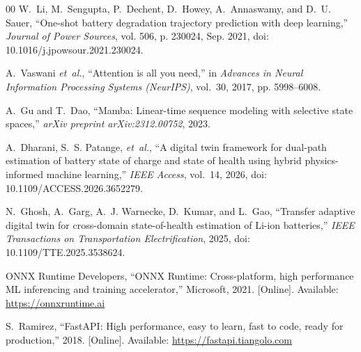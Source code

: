 \documentclass[conference]{IEEEtran}
\begin{document}
\begin{thebibliography}{00}
W.~Li, M.~Sengupta, P.~Dechent, D.~Howey, A.~Annaswamy, and D.~U. Sauer, ``One-shot battery degradation trajectory prediction with deep learning,'' \emph{Journal of Power Sources}, vol. 506, p. 230024, Sep. 2021, doi: 10.1016/j.jpowsour.2021.230024.

A.~Vaswani \emph{et~al.}, ``Attention is all you need,'' in \emph{Advances in Neural Information Processing Systems (NeurIPS)}, vol.~30, 2017, pp. 5998--6008.

A.~Gu and T.~Dao, ``Mamba: Linear-time sequence modeling with selective state spaces,'' \emph{arXiv preprint arXiv:2312.00752}, 2023.

A.~Dharani, S.~S. Patange, \emph{et~al.}, ``A digital twin framework for dual-path estimation of battery state of charge and state of health using hybrid physics-informed machine learning,'' \emph{IEEE Access}, vol.~14, 2026, doi: 10.1109/ACCESS.2026.3652279.

N.~Ghosh, A.~Garg, A.~J. Warnecke, D.~Kumar, and L.~Gao, ``Transfer adaptive digital twin for cross-domain state-of-health estimation of Li-ion batteries,'' \emph{IEEE Transactions on Transportation Electrification}, 2025, doi: 10.1109/TTE.2025.3538624.

ONNX Runtime Developers, ``ONNX Runtime: Cross-platform, high performance ML inferencing and training accelerator,'' Microsoft, 2021. [Online]. Available: \url{https://onnxruntime.ai}

S.~Ramirez, ``FastAPI: High performance, easy to learn, fast to code, ready for production,'' 2018. [Online]. Available: \url{https://fastapi.tiangolo.com}

\end{thebibliography}
\end{document}
